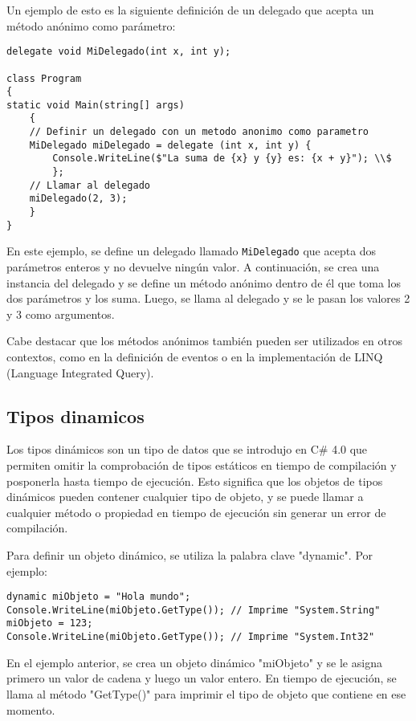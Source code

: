 \documentclass[executivepaper]{article}
\begin{document}
Un ejemplo de esto es la siguiente definición de un delegado que acepta un método anónimo como parámetro:

\begin{lstlisting}
delegate void MiDelegado(int x, int y);

class Program
{
static void Main(string[] args)
    {
    // Definir un delegado con un metodo anonimo como parametro
    MiDelegado miDelegado = delegate (int x, int y) {
        Console.WriteLine($"La suma de {x} y {y} es: {x + y}"); \\$
        };
    // Llamar al delegado
    miDelegado(2, 3);
    }
}
\end{lstlisting}

En este ejemplo, se define un delegado llamado \texttt{MiDelegado} que acepta dos parámetros enteros y no devuelve ningún valor. A continuación, se crea una instancia del delegado y se define un método anónimo dentro de él que toma los dos parámetros y los suma. Luego, se llama al delegado y se le pasan los valores 2 y 3 como argumentos.

Cabe destacar que los métodos anónimos también pueden ser utilizados en otros contextos, como en la definición de eventos o en la implementación de LINQ (Language Integrated Query).

\subsection*{Tipos dinamicos}

Los tipos dinámicos son un tipo de datos que se introdujo en C\# 4.0 que permiten omitir la comprobación de tipos estáticos en tiempo de compilación y posponerla hasta tiempo de ejecución. Esto significa que los objetos de tipos dinámicos pueden contener cualquier tipo de objeto, y se puede llamar a cualquier método o propiedad en tiempo de ejecución sin generar un error de compilación.

Para definir un objeto dinámico, se utiliza la palabra clave "dynamic". Por ejemplo:

\begin{lstlisting}
dynamic miObjeto = "Hola mundo";
Console.WriteLine(miObjeto.GetType()); // Imprime "System.String"
miObjeto = 123;
Console.WriteLine(miObjeto.GetType()); // Imprime "System.Int32"
\end{lstlisting}

En el ejemplo anterior, se crea un objeto dinámico "miObjeto" y se le asigna primero un valor de cadena y luego un valor entero. En tiempo de ejecución, se llama al método "GetType()" para imprimir el tipo de objeto que contiene en ese momento.
\end{document}
